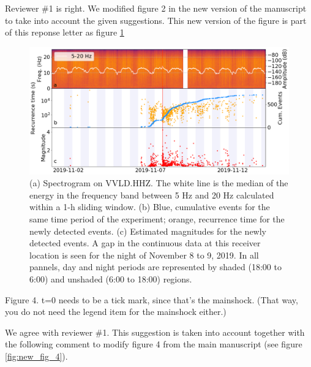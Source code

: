 \documentclass[10pt]{extarticle}
\begin{document}
\begin{Answer}
Reviewer \#1 is right. We modified figure 2 in the new version of the manuscript to take into account the given suggestions. This new version of the figure is part of this reponse letter as figure \ref{fig:new_fig_2}
 \WorkInProgressRevTask
\begin{figure}[!h]
\begin{center}
 \includegraphics[width=1\linewidth]{spec_rec_mag.png} 
 \caption{(a) Spectrogram on VVLD.HHZ. The white line is the median of the energy in the frequency band between 5 Hz and 20 Hz calculated within a 1-h sliding window. (b) Blue, cumulative events for the same time period of the experiment; orange, recurrence time for the newly detected events. (c) Estimated magnitudes for the newly detected events. A gap in the continuous data at this receiver location is seen for the night of November 8 to 9, 2019. In all pannels, day and night periods are represented by shaded (18:00 to 6:00) and unshaded (6:00 to 18:00) regions.}
\end{center}
\label{fig:new_fig_2}
\end{figure}
\end{Answer}
%
%


\begin{ReviewerComment}{1}
\noindent 
Figure 4. t=0 needs to be a tick mark, since that's the mainshock. (That way, you do not need the legend item for the mainshock either.)
\end{ReviewerComment}


\begin{Answer}
 \WorkInProgressRevTask
We agree with reviewer \#1. This suggestion is taken into account together with the following comment to modify figure 4 from the main manuscript (see figure \ref{fig:new_fig_4}).
\end{Answer}
%
%
\end{document}
